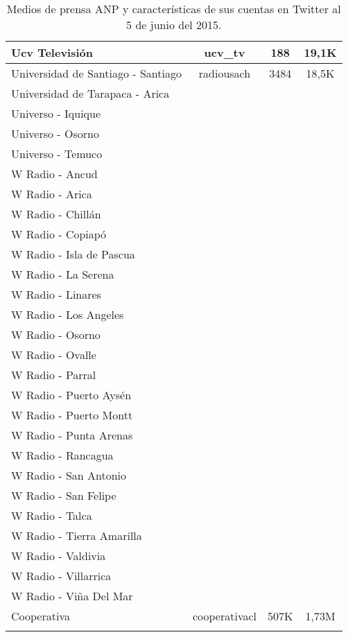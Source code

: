 \begin{center}
\begin{longtable}{| l | c | c | c |}
Ucv Televisión	&	ucv\_tv	&	188	&	19,1K	\\ \hline
Universidad de Santiago - Santiago	&	radiousach	&	3484	&	18,5K	\\ \hline
Universidad de Tarapaca - Arica	&		&		&		\\ \hline
Universo - Iquique	&		&		&		\\ \hline
Universo - Osorno	&		&		&		\\ \hline
Universo - Temuco	&		&		&		\\ \hline
W Radio - Ancud	&		&		&		\\ \hline
W Radio - Arica	&		&		&		\\ \hline
W Radio - Chillán	&		&		&		\\ \hline
W Radio - Copiapó	&		&		&		\\ \hline
W Radio - Isla de Pascua	&		&		&		\\ \hline
W Radio - La Serena	&		&		&		\\ \hline
W Radio - Linares	&		&		&		\\ \hline
W Radio - Los Angeles	&		&		&		\\ \hline
W Radio - Osorno	&		&		&		\\ \hline
W Radio - Ovalle	&		&		&		\\ \hline
W Radio - Parral	&		&		&		\\ \hline
W Radio - Puerto Aysén	&		&		&		\\ \hline
W Radio - Puerto Montt	&		&		&		\\ \hline
W Radio - Punta Arenas	&		&		&		\\ \hline
W Radio - Rancagua	&		&		&		\\ \hline
W Radio - San Antonio	&		&		&		\\ \hline
W Radio - San Felipe	&		&		&		\\ \hline
W Radio - Talca	&		&		&		\\ \hline
W Radio - Tierra Amarilla	&		&		&		\\ \hline
W Radio - Valdivia	&		&		&		\\ \hline
W Radio - Villarrica	&		&		&		\\ \hline
W Radio - Viña Del Mar	&		&		&		\\ \hline
Cooperativa	&	cooperativacl	&	507K	&	1,73M	\\ \hline
\caption {Medios de prensa ANP y características de sus cuentas en Twitter al 5 de junio del 2015.}
	\end{longtable}
\end{center}

